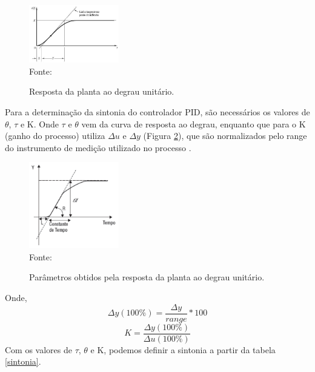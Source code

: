 \documentclass[12 pt,conference]{IEEEtran}
\begin{document}
    \begin{figure}[!http]
       \centering
        \caption{Resposta da planta ao degrau unitário.}
        \includegraphics[width=0.35\textwidth]{imagens/degrau_Z&N.png}\\ 
        Fonte: \cite{teixeira2010controles}
        \label{figura:degrau}
    \end{figure}
    
Para a determinação da sintonia do controlador PID, são necessários os valores de \(\theta\), \(\tau\) e K. Onde \(\tau\) e \(\theta\) vem da curva de resposta ao degrau, enquanto que para o K (ganho do processo) utiliza \(\Delta u\) e \(\Delta y\) (Figura \ref{figura:constantes}), que são normalizados pelo range do instrumento de medição utilizado no processo \cite{teixeira2010controles}.

    \begin{figure}[!http]
       \centering
        \caption{Parâmetros obtidos pela resposta da planta ao degrau unitário.}
        \includegraphics[width=0.35\textwidth]{imagens/constantes_Z&N.png}\\ 
        Fonte: \cite{teixeira2010controles}
        \label{figura:constantes}
    \end{figure}

Onde,
\begin{equation}
\Delta y  (100\%) = \frac{\Delta y}{range} * 100
\label{deltay}
\end{equation}
\begin{equation}
K = \frac{\Delta y (100\%)}{\Delta u (100\%)}
\label{K}
\end{equation}
\newpage
Com os valores de \(\tau\), \(\theta\) e K, podemos definir a sintonia a partir da tabela \ref{sintonia}.
\end{document}
